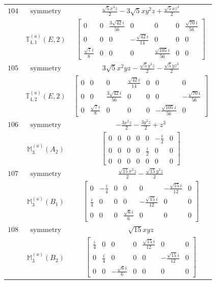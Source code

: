 \documentclass[fleqn,8pt,landscape]{jsarticle}
\begin{document}
\begin{longtable}{ccc}
$ 104 $ & $ \text{symmetry} $ & $ \frac{\sqrt{5} x^{3} z}{2} - 3 \sqrt{5} x y^{2} z + \frac{\sqrt{5} x z^{3}}{2} $ \\
$  $ & $ \mathbb{T}_{4,1}^{(a)}(E,2) $ & $ \begin{bmatrix} 0 & 0 & \frac{3 \sqrt{42} i}{56} & 0 & 0 & 0 & \frac{\sqrt{70} i}{56} \\ 0 & 0 & 0 & - \frac{\sqrt{42} i}{14} & 0 & 0 & 0 \\ \frac{\sqrt{7} i}{8} & 0 & 0 & 0 & \frac{\sqrt{105} i}{56} & 0 & 0 \end{bmatrix} $ \\ \hline
$ 105 $ & $ \text{symmetry} $ & $ 3 \sqrt{5} x^{2} y z - \frac{\sqrt{5} y^{3} z}{2} - \frac{\sqrt{5} y z^{3}}{2} $ \\
$  $ & $ \mathbb{T}_{4,2}^{(a)}(E,2) $ & $ \begin{bmatrix} 0 & 0 & 0 & \frac{\sqrt{42} i}{14} & 0 & 0 & 0 \\ 0 & 0 & \frac{3 \sqrt{42} i}{56} & 0 & 0 & 0 & - \frac{\sqrt{70} i}{56} \\ 0 & \frac{\sqrt{7} i}{8} & 0 & 0 & 0 & - \frac{\sqrt{105} i}{56} & 0 \end{bmatrix} $ \\ \hline
$ 106 $ & $ \text{symmetry} $ & $ - \frac{3 x^{2} z}{2} - \frac{3 y^{2} z}{2} + z^{3} $ \\
$  $ & $ \mathbb{M}_{3}^{(a)}(A_{2}) $ & $ \begin{bmatrix} 0 & 0 & 0 & 0 & 0 & - \frac{i}{2} & 0 \\ 0 & 0 & 0 & 0 & \frac{i}{2} & 0 & 0 \\ 0 & 0 & 0 & 0 & 0 & 0 & 0 \end{bmatrix} $ \\ \hline
$ 107 $ & $ \text{symmetry} $ & $ \frac{\sqrt{15} x^{2} z}{2} - \frac{\sqrt{15} y^{2} z}{2} $ \\
$  $ & $ \mathbb{M}_{3}^{(a)}(B_{1}) $ & $ \begin{bmatrix} 0 & - \frac{i}{4} & 0 & 0 & 0 & - \frac{\sqrt{15} i}{12} & 0 \\ \frac{i}{4} & 0 & 0 & 0 & - \frac{\sqrt{15} i}{12} & 0 & 0 \\ 0 & 0 & 0 & \frac{\sqrt{6} i}{6} & 0 & 0 & 0 \end{bmatrix} $ \\ \hline
$ 108 $ & $ \text{symmetry} $ & $ \sqrt{15} x y z $ \\
$  $ & $ \mathbb{M}_{3}^{(a)}(B_{2}) $ & $ \begin{bmatrix} \frac{i}{4} & 0 & 0 & 0 & \frac{\sqrt{15} i}{12} & 0 & 0 \\ 0 & \frac{i}{4} & 0 & 0 & 0 & - \frac{\sqrt{15} i}{12} & 0 \\ 0 & 0 & - \frac{\sqrt{6} i}{6} & 0 & 0 & 0 & 0 \end{bmatrix} $ \\ \hline

\end{longtable}
\end{document}

